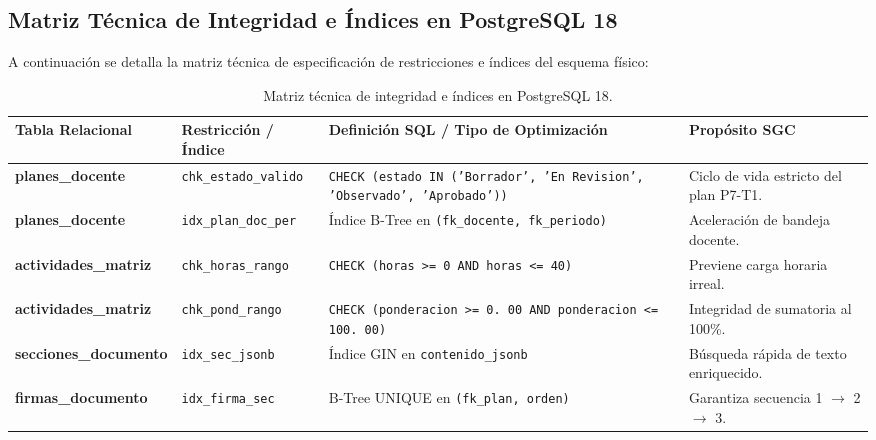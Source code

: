 \documentclass[12pt,a4paper]{article}
\begin{document}
\subsection{Matriz Técnica de Integridad e Índices en PostgreSQL 18}
A continuación se detalla la matriz técnica de especificación de restricciones e índices del esquema físico:
\begin{table}[H]
\centering
\small
\renewcommand{\arraystretch}{1.2}
\begin{tabularx}{\textwidth}{|>{\hsize=0.9\hsize\raggedright\arraybackslash\bfseries\footnotesize}X|>{\hsize=0.9\hsize\raggedright\arraybackslash\footnotesize}X|>{\hsize=1.1\hsize\raggedright\arraybackslash\footnotesize}X|>{\hsize=1.1\hsize\raggedright\arraybackslash\footnotesize}X|}
\hline
\rowcolor{tableheader}
\textbf{Tabla Relacional} & \textbf{Restricción / Índice} & \textbf{Definición SQL / Tipo de Optimización} & \textbf{Propósito SGC} \\
\hline
planes\allowbreak\_docente & \texttt{chk\_\allowbreak  estado\_\allowbreak  valido} & \texttt{CHECK (estado IN ('Borrador', 'En Revision', 'Observado', 'Aprobado'))} & Ciclo de vida estricto del plan P7-T1. \\
\hline
planes\allowbreak\_docente & \texttt{idx\_\allowbreak  plan\_\allowbreak  doc\_\allowbreak  per} & Índice B-Tree en \texttt{(fk\_\allowbreak  docente, fk\_\allowbreak  periodo)} & Aceleración de bandeja docente. \\
\hline
actividades\allowbreak\_matriz & \texttt{chk\_\allowbreak  horas\_\allowbreak  rango} & \texttt{CHECK (horas >= 0 AND horas <= 40)} & Previene carga horaria irreal. \\
\hline
actividades\allowbreak\_matriz & \texttt{chk\_\allowbreak  pond\_\allowbreak  rango} & \texttt{CHECK (ponderacion >= 0. 00 AND ponderacion <= 100. 00)} & Integridad de sumatoria al 100\%. \\
\hline
secciones\allowbreak\_documento & \texttt{idx\_\allowbreak  sec\_\allowbreak  jsonb} & Índice GIN en \texttt{contenido\_\allowbreak  jsonb} & Búsqueda rápida de texto enriquecido. \\
\hline
firmas\allowbreak\_documento & \texttt{idx\_\allowbreak  firma\_\allowbreak  sec} & B-Tree UNIQUE en \texttt{(fk\_\allowbreak  plan, orden)} & Garantiza secuencia 1 $\to$ 2 $\to$ 3. \\
\hline
\end{tabularx}
\caption{Matriz técnica de integridad e índices en PostgreSQL 18.}
\label{tab:indices_ddl}
\end{table}
\end{document}
